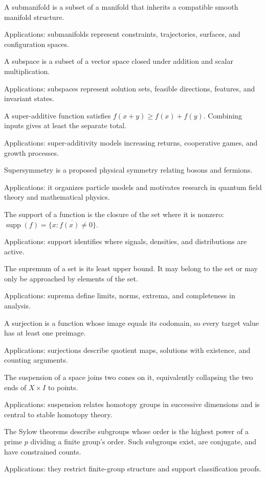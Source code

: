 A submanifold is a subset of a manifold that inherits a compatible smooth manifold structure. \par\noindent Applications: submanifolds represent constraints, trajectories, surfaces, and configuration spaces.

A subspace is a subset of a vector space closed under addition and scalar multiplication. \par\noindent Applications: subspaces represent solution sets, feasible directions, features, and invariant states.

A super-additive function satisfies $f(x+y)\geq f(x)+f(y)$. Combining inputs gives at least the separate total. \par\noindent Applications: super-additivity models increasing returns, cooperative games, and growth processes.

Supersymmetry is a proposed physical symmetry relating bosons and fermions. \par\noindent Applications: it organizes particle models and motivates research in quantum field theory and mathematical physics.

The support of a function is the closure of the set where it is nonzero: $\operatorname{supp}(f)=\overline{\{x:f(x)\ne0\}}$. \par\noindent Applications: support identifies where signals, densities, and distributions are active.

The supremum of a set is its least upper bound. It may belong to the set or may only be approached by elements of the set. \par\noindent Applications: suprema define limits, norms, extrema, and completeness in analysis.

A surjection is a function whose image equals its codomain, so every target value has at least one preimage. \par\noindent Applications: surjections describe quotient maps, solutions with existence, and counting arguments.

The suspension of a space joins two cones on it, equivalently collapsing the two ends of $X\times I$ to points. \par\noindent Applications: suspension relates homotopy groups in successive dimensions and is central to stable homotopy theory.

The Sylow theorems describe subgroups whose order is the highest power of a prime $p$ dividing a finite group's order. Such subgroups exist, are conjugate, and have constrained counts. \par\noindent Applications: they restrict finite-group structure and support classification proofs.

